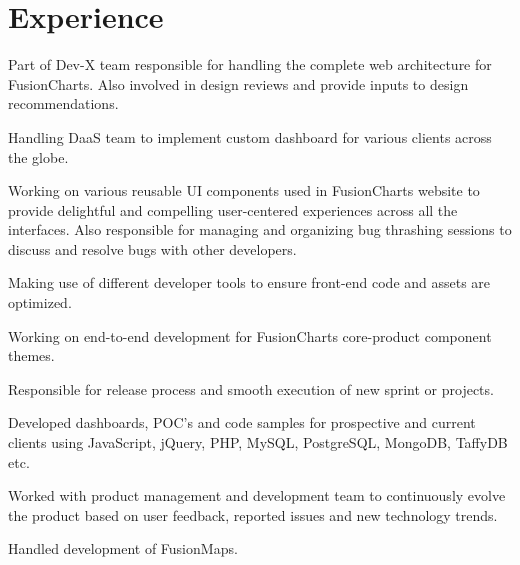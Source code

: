 \documentclass[]{gagan-resume}
\begin{document}
\hfill
\begin{minipage}[t]{0.65\textwidth}



\vspace{\topsep}

\section{Experience}

\vspace{\topsep}
\vspace{\topsep}
\begin{tightemize}
\item Part of Dev-X team responsible for handling the complete web architecture for FusionCharts. Also involved in design reviews and provide inputs to design recommendations.
\item Handling DaaS team to implement custom dashboard
for various clients across the globe.
\item Working on various reusable UI components used in FusionCharts website to provide delightful and compelling user-centered experiences across all the interfaces. Also responsible for managing and organizing bug thrashing sessions to discuss and resolve bugs with other developers.
\item Making use of different developer tools to ensure front-end code and assets are optimized. 
\item Working on end-to-end development for FusionCharts core-product component themes.
\item Responsible for release process and smooth execution of new sprint or projects.
\end{tightemize}
\sectionsep

\vspace{\topsep}
\begin{tightemize}
\item Developed dashboards, POC’s and code samples for prospective and current clients using JavaScript, jQuery, PHP, MySQL, PostgreSQL, MongoDB, TaffyDB etc.
\item Worked with product management and development team to continuously evolve the product based on user feedback, reported issues and new technology trends.
\item Handled development of FusionMaps.
\end{tightemize}
\sectionsep


\end{minipage}
\end{document}
